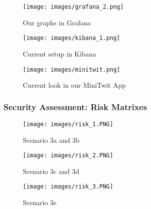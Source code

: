\documentclass{article}
\begin{document}
\begin{figure}[h!]
    \centering
    \texttt{[image: images/grafana\_2.png]}
    \caption{ Our graphs in Grafana }
\end{figure}

\begin{figure}[h!]
    \centering
    \texttt{[image: images/kibana\_1.png]}
    \caption{ Current setup in Kibana }
\end{figure}

\begin{figure}[h!]
    \centering
    \texttt{[image: images/minitwit.png]}
    \caption{ Current look in our MiniTwit App }
\end{figure}

\newpage
\subsubsection{Security Assessment: Risk Matrixes}
\begin{figure}[h!]
    \centering
    \texttt{[image: images/risk\_1.PNG]}
    \caption{ Scenario 3a and 3b }
\end{figure}

\begin{figure}[h!]
    \centering
    \texttt{[image: images/risk\_2.PNG]}
    \caption{ Scenario 3c and 3d }
\end{figure}

\begin{figure}[h!]
    \centering
    \texttt{[image: images/risk\_3.PNG]}
    \caption{ Scenario 3e }
\end{figure}
\end{document}
